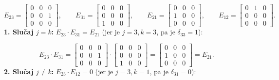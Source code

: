\documentclass[a4paper,12pt,twoside]{report}
\numberwithin{algorithm}{section}
\begin{document}
\[
E_{23} = 
\begin{bmatrix}
0 & 0 & 0 \\
0 & 0 & 1 \\
0 & 0 & 0
\end{bmatrix}, \qquad
E_{31} = 
\begin{bmatrix}
0 & 0 & 0 \\
0 & 0 & 0 \\
1 & 0 & 0
\end{bmatrix}, \qquad
E_{21} = 
\begin{bmatrix}
0 & 0 & 0 \\
1 & 0 & 0 \\
0 & 0 & 0
\end{bmatrix}, \qquad
E_{12} = 
\begin{bmatrix}
0 & 1 & 0 \\
0 & 0 & 0 \\
0 & 0 & 0
\end{bmatrix}.
\]
\vfill
\medskip
\noindent
\textbf{1. Slučaj $j = k$:} $E_{23} \cdot E_{31} = E_{21}$ (jer je $j=3, k=3$, pa je $\delta_{33}=1$):

\[
E_{23} \cdot E_{31} =
\begin{bmatrix}
0 & 0 & 0 \\
0 & 0 & 1 \\
0 & 0 & 0
\end{bmatrix}
\cdot
\begin{bmatrix}
0 & 0 & 0 \\
0 & 0 & 0 \\
1 & 0 & 0
\end{bmatrix}
=
\begin{bmatrix}
0 & 0 & 0 \\
1 & 0 & 0 \\
0 & 0 & 0
\end{bmatrix}
= E_{21}.
\]
\vfill
\medskip
\noindent
\textbf{2. Slučaj $j \neq k$:} $E_{23} \cdot E_{12} = 0$ (jer je $j=3, k=1$, pa je $\delta_{31}=0$):
\end{document}
